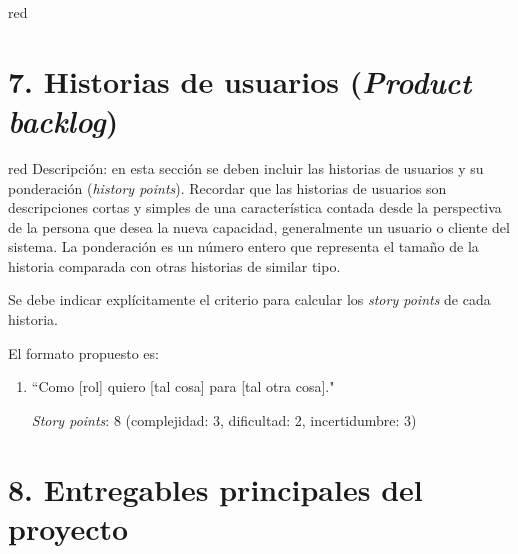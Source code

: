 \documentclass[
11pt, %
]{charter}
\begin{document}
{\begin{consigna}{red}
\end{consigna} %

\section{7. Historias de usuarios (\textit{Product backlog})}
\label{sec:backlog}

\begin{consigna}{red}
Descripción: en esta sección se deben incluir las historias de usuarios y su ponderación (\textit{history points}). Recordar que las historias de usuarios son descripciones cortas y simples de una característica contada desde la perspectiva de la persona que desea la nueva capacidad, generalmente un usuario o cliente del sistema. La ponderación es un número entero que representa el tamaño de la historia comparada con otras historias de similar tipo.

Se debe indicar explícitamente el criterio para calcular los \textit{story points} de cada historia.

El formato propuesto es: 
\begin{enumerate}
\item ``Como [rol] quiero [tal cosa] para [tal otra cosa]."

\textit{Story points}: 8 (complejidad: 3, dificultad: 2, incertidumbre: 3)
\end{enumerate}
\end{consigna}

\section{8. Entregables principales del proyecto}
\label{sec:entregables}


	
}
\end{document}
